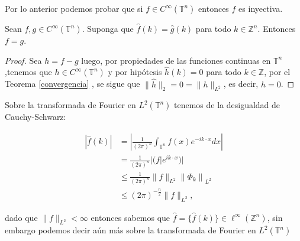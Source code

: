 \documentclass[12pt]{article}
\newcommand\Z{\ensuremath{\mathbb{Z}}}
\newcommand\T{\mathbb{T}}
\renewcommand{\hat}{\widehat}
\begin{document}
Por lo anterior podemos probar que si $f\in C^{\infty}(\T^{n})$ entonces $\widehat{f}$ es inyectiva.
\begin{theorem}\label{inyectiva}
Sean $f, g \in C^{\infty}(\T^{n})$. Suponga que $\widehat{f}(k) = \widehat{g}(k)$ para todo $k \in \mathbb{Z}^{n}$. Entonces $f = g$.
\end{theorem}
\begin{proof}

 Sea $h = f - g$ luego, por propiedades de las funciones continuas en $\T^{n}$,tenemos que $h \in C^{\infty}(\T^{n})$ y por hipótesis $\hat{h}(k) = 0$ para todo $k \in \mathbb{Z}$, por el Teorema \ref{convergencia}  , se sigue que $\|\hat{h}\|_2= 0=\|h\|_{L^2}$, es decir, $h = 0$.       
\end{proof}
        
\begin{note}
  Sobre la transformada de Fourier en $L^2(\T^n)$ tenemos de la desigualdad de Cauchy-Schwarz:

$$
\begin{aligned}
|\hat{f}(k)| & =\left|\frac{1}{(2 \pi)^n} \int_{\T^n} f(x) e^{-i k \cdot x} d x\right| \\
& =\frac{1}{(2 \pi)^n} |(f|e^{i k \cdot x}) | \\
& \leq \frac{1}{(2 \pi)^n}\|f\|_{L^2}\left\|\Phi_k \right\|_{L^2} \\
& \leq(2 \pi)^{-\frac{n}{2}}\|f\|_{L^2},
\end{aligned}
$$

dado que $\|f\|_{L^2}<\infty$ entonces sabemos que $\widehat{f}=\{\widehat{f}(k)\}\in \ell^{\infty}(\Z^n)$, sin embargo podemos decir aún más sobre la transformada de Fourier en $L^2(\T^n)$  
\end{note}
\end{document}
